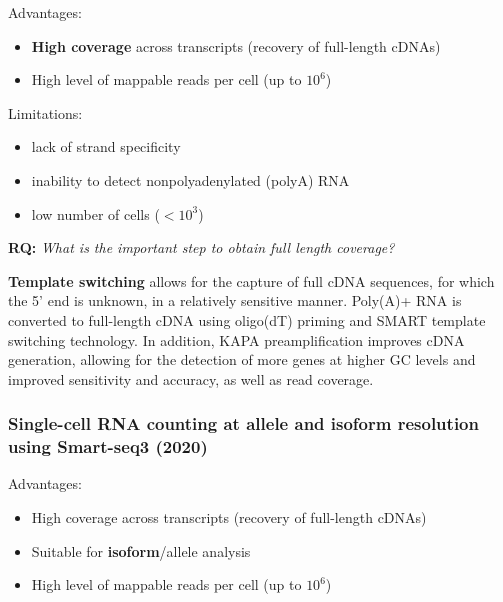 Advantages:

\begin{itemize}
\tightlist
\item
  \textbf{High coverage} across transcripts (recovery of full-length
  cDNAs)
\item
  High level of mappable reads per cell (up to $10^6$)
\end{itemize}

Limitations:

\begin{itemize}
\tightlist
\item
  lack of strand specificity
\item
  inability to detect nonpolyadenylated (polyA) RNA
\item
  low number of cells ($< 10^3$)
\end{itemize}

\begin{tcolorbox}
[width=\linewidth, sharp corners=all, colback=white!95!black]

\textbf{RQ: } \emph{What is the important step to obtain full length coverage?}

\textbf{Template switching} allows for the capture of full cDNA
sequences, for which the 5' end is unknown, in a relatively sensitive
manner. Poly(A)+ RNA is converted to full-length cDNA using oligo(dT)
priming and SMART template switching technology. In addition, KAPA
preamplification improves cDNA generation, allowing for the detection of
more genes at higher GC levels and improved sensitivity and accuracy, as
well as read coverage.
\end{tcolorbox}

\hypertarget{single-cell-rna-counting-at-allele-and-isoform-resolution-using-smart-seq3-2020}{%
\subsubsection{Single-cell RNA counting at allele and isoform resolution
using Smart-seq3
(2020)}\label{single-cell-rna-counting-at-allele-and-isoform-resolution-using-smart-seq3-2020}}

Advantages:

\begin{itemize}
\tightlist
\item
  High coverage across transcripts (recovery of full-length cDNAs)
\item
  Suitable for \textbf{isoform}/allele analysis
\item
  High level of mappable reads per cell (up to $10^6$)
\end{itemize}

